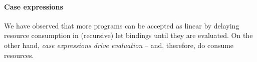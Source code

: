 \documentclass[acmsmall,review,screen]{acmart}
\newcommand{\parawith}[1]{\paragraph{\emph{#1}}}
\begin{document}

\paragraph{Case expressions}
We have observed that more programs can be accepted as linear by delaying
resource consumption in (recursive) let bindings until they are evaluated.
On the other hand, \emph{case expressions drive evaluation} -- and, therefore,
do consume resources.



\end{document}
